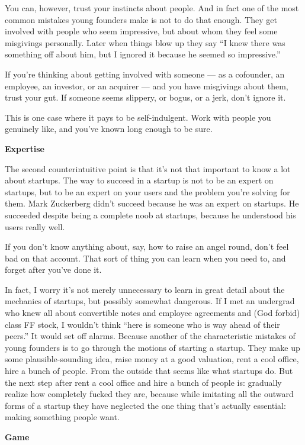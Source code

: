 You can, however, trust your instincts about people. And in fact one of
the most common mistakes young founders make is not to do that enough.
They get involved with people who seem impressive, but about whom they
feel some misgivings personally. Later when things blow up they say ``I
knew there was something off about him, but I ignored it because he
seemed so impressive.''

If you're thinking about getting involved with someone --- as a
cofounder, an employee, an investor, or an acquirer --- and you have
misgivings about them, trust your gut. If someone seems slippery, or
bogus, or a jerk, don't ignore it.

This is one case where it pays to be self-indulgent. Work with people
you genuinely like, and you've known long enough to be sure.

\textbf{Expertise}

The second counterintuitive point is that it's not that important to
know a lot about startups. The way to succeed in a startup is not to be
an expert on startups, but to be an expert on your users and the problem
you're solving for them. Mark Zuckerberg didn't succeed because he was
an expert on startups. He succeeded despite being a complete noob at
startups, because he understood his users really well.

If you don't know anything about, say, how to raise an angel round,
don't feel bad on that account. That sort of thing you can learn when
you need to, and forget after you've done it.

In fact, I worry it's not merely unnecessary to learn in great detail
about the mechanics of startups, but possibly somewhat dangerous. If I
met an undergrad who knew all about convertible notes and employee
agreements and (God forbid) class FF stock, I wouldn't think ``here is
someone who is way ahead of their peers.'' It would set off alarms.
Because another of the characteristic mistakes of young founders is to
go through the motions of starting a startup. They make up some
plausible-sounding idea, raise money at a good valuation, rent a cool
office, hire a bunch of people. From the outside that seems like what
startups do. But the next step after rent a cool office and hire a bunch
of people is: gradually realize how completely fucked they are, because
while imitating all the outward forms of a startup they have neglected
the one thing that's actually essential: making something people want.

\textbf{Game}

